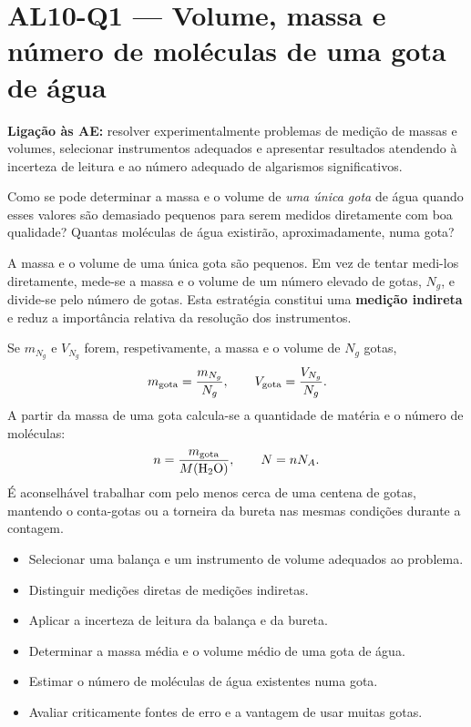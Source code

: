 \documentclass[11pt,a4paper,openany]{book}
\newcommand{\LigAE}[1]{\textbf{Ligação às AE:} #1}
\begin{document}
\section{AL10-Q1 — Volume, massa e número de moléculas de uma gota de água}
\LigAE{resolver experimentalmente problemas de medição de massas e volumes, selecionar instrumentos adequados e apresentar resultados atendendo à incerteza de leitura e ao número adequado de algarismos significativos.}

\begin{questao}
Como se pode determinar a massa e o volume de \emph{uma única gota} de água quando esses valores são demasiado pequenos para serem medidos diretamente com boa qualidade? Quantas moléculas de água existirão, aproximadamente, numa gota?
\end{questao}

\begin{fundamento}
A massa e o volume de uma única gota são pequenos. Em vez de tentar medi-los diretamente, mede-se a massa e o volume de um número elevado de gotas, $N_g$, e divide-se pelo número de gotas. Esta estratégia constitui uma \textbf{medição indireta} e reduz a importância relativa da resolução dos instrumentos.

Se $m_{N_g}$ e $V_{N_g}$ forem, respetivamente, a massa e o volume de $N_g$ gotas,
\[
 m_{\rm gota}=\frac{m_{N_g}}{N_g},
 \qquad
 V_{\rm gota}=\frac{V_{N_g}}{N_g}.
\]
A partir da massa de uma gota calcula-se a quantidade de matéria e o número de moléculas:
\[
 n=\frac{m_{\rm gota}}{M(\ce{H2O})},
 \qquad
 N=nN_A.
\]
É aconselhável trabalhar com pelo menos cerca de uma centena de gotas, mantendo o conta-gotas ou a torneira da bureta nas mesmas condições durante a contagem. \cite{DGEGTA5,ProgramaFQA}
\end{fundamento}

\begin{objetivos}
\begin{itemize}
\item Selecionar uma balança e um instrumento de volume adequados ao problema.
\item Distinguir medições diretas de medições indiretas.
\item Aplicar a incerteza de leitura da balança e da bureta.
\item Determinar a massa média e o volume médio de uma gota de água.
\item Estimar o número de moléculas de água existentes numa gota.
\item Avaliar criticamente fontes de erro e a vantagem de usar muitas gotas.
\end{itemize}
\end{objetivos}
\end{document}
